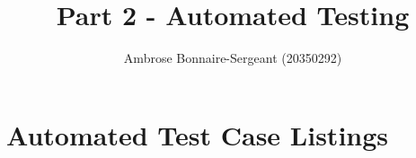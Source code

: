 \documentclass{article}
\title{Part 2 - Automated Testing}
\author{Ambrose Bonnaire-Sergeant (20350292)}
\begin{document}
\maketitle
\tableofcontents

\section{Automated Test Case Listings}


\newpage


\newpage


\newpage


\newpage


\newpage


\newpage


\newpage


\newpage


\newpage


\newpage


\newpage


\newpage


\newpage


\newpage


\newpage
\end{document}
